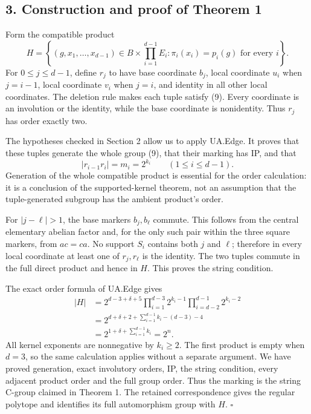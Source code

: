 \documentclass[
  11pt,
  a4paper,
]{article}
\begin{document}
\subsection{3. Construction and proof of Theorem
1}\label{construction-and-proof-of-theorem-1}

Form the compatible product \[
H=\left\{(g,x_1,\ldots,x_{d-1})\in B\times\prod_{i=1}^{d-1}E_i:
\pi_i(x_i)=p_i(g)\text{ for every }i\right\}.
\tag{9}
\] For \(0\le j\le d-1\), define \(r_j\) to have base coordinate
\(b_j\), local coordinate \(u_i\) when \(j=i-1\), local coordinate
\(v_i\) when \(j=i\), and identity in all other local coordinates. The
deletion rule makes each tuple satisfy (9). Every coordinate is an
involution or the identity, while the base coordinate is nonidentity.
Thus \(r_j\) has order exactly two.

The hypotheses checked in Section 2 allow us to apply UA.Edge. It proves
that these tuples generate the whole group (9), that their marking has
IP, and that \[
|r_{i-1}r_i|=m_i=2^{k_i}\qquad(1\le i\le d-1).
\tag{10}
\] Generation of the whole compatible product is essential for the order
calculation: it is a conclusion of the supported-kernel theorem, not an
assumption that the tuple-generated subgroup has the ambient product's
order.

For \(|j-\ell|>1\), the base markers \(b_j,b_\ell\) commute. This
follows from the central elementary abelian factor and, for the only
such pair within the three square markers, from \(ac=ca\). No support
\(S_i\) contains both \(j\) and \(\ell\); therefore in every local
coordinate at least one of \(r_j,r_\ell\) is the identity. The two
tuples commute in the full direct product and hence in \(H\). This
proves the string condition.

The exact order formula of UA.Edge gives \[
\begin{aligned}
|H|
&=2^{d-3+\delta+5}
  \prod_{i=1}^{d-3}2^{k_i-1}
  \prod_{i=d-2}^{d-1}2^{k_i-2}\\
&=2^{d+\delta+2+\sum_{i=1}^{d-1}k_i-(d-3)-4}\\
&=2^{1+\delta+\sum_{i=1}^{d-1}k_i}
 =2^n.
\end{aligned}
\tag{11}
\] All kernel exponents are nonnegative by \(k_i\ge2\). The first
product is empty when \(d=3\), so the same calculation applies without a
separate argument. We have proved generation, exact involutory orders,
IP, the string condition, every adjacent product order and the full
group order. Thus the marking is the string C-group claimed in Theorem
1. The retained correspondence gives the regular polytope and identifies
its full automorphism group with \(H\). \(\square\)
\end{document}
